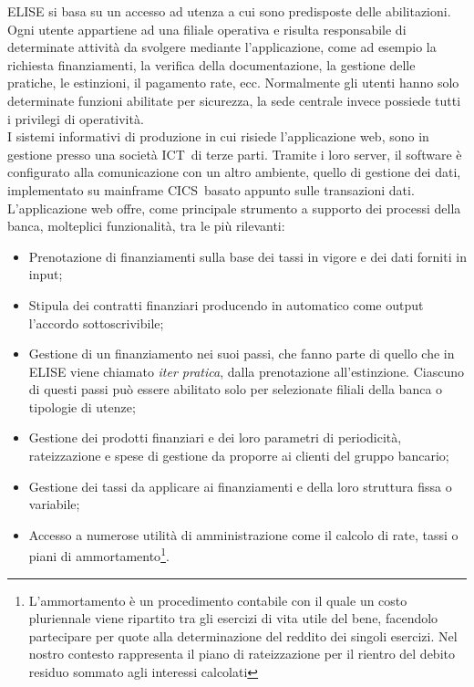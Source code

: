 	ELISE si basa su un accesso ad utenza a cui sono predisposte delle abilitazioni. Ogni utente appartiene ad una filiale operativa e risulta responsabile di determinate attività da svolgere mediante l'applicazione, come ad esempio la richiesta finanziamenti, la verifica della documentazione, la gestione delle pratiche, le estinzioni, il pagamento rate, ecc. Normalmente gli utenti hanno solo determinate funzioni abilitate per sicurezza, la sede centrale invece possiede tutti i privilegi di operatività.\\
	
	I sistemi informativi di produzione in cui risiede l'applicazione web, sono in gestione presso una società ICT\glossario\ di terze parti. Tramite i loro server, il software è configurato alla comunicazione con un altro ambiente, quello di gestione dei dati, implementato su mainframe CICS\glossario\ basato appunto sulle transazioni dati.\\
		
	
	L'applicazione web offre, come principale strumento a supporto dei processi della banca, molteplici funzionalità, tra le più rilevanti:
	
	\begin{itemize}
		\item Prenotazione di finanziamenti sulla base dei tassi in vigore e dei dati forniti in input;
		\item Stipula dei contratti finanziari producendo in automatico come output l'accordo sottoscrivibile;
		\item Gestione di un finanziamento nei suoi passi, che fanno parte di quello che in ELISE viene chiamato \textit{iter pratica}, dalla prenotazione all'estinzione. Ciascuno di questi passi può essere abilitato solo per selezionate filiali della banca o tipologie di utenze;
		\item Gestione dei prodotti finanziari e dei loro parametri di periodicità, rateizzazione e spese di gestione da proporre ai clienti del gruppo bancario;
		\item Gestione dei tassi da applicare ai finanziamenti e della loro struttura fissa o variabile;
		\item Accesso a numerose utilità di amministrazione come il calcolo di rate, tassi o piani di ammortamento\footnote{L'ammortamento è un procedimento contabile con il quale un costo pluriennale viene ripartito tra gli esercizi di vita utile del bene, facendolo partecipare per quote alla determinazione del reddito dei singoli esercizi. Nel nostro contesto rappresenta il piano di rateizzazione per il rientro del debito residuo sommato agli interessi calcolati}.	
	\end{itemize}
		
